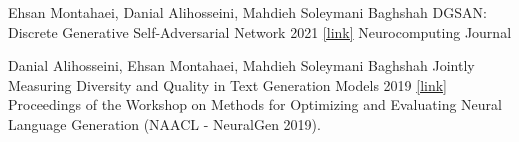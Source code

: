 
\begin{cventries}
    \cventry
    {Ehsan Montahaei, Danial Alihosseini, Mahdieh Soleymani Baghshah}
    {DGSAN: Discrete Generative Self-Adversarial Network}
    {2021}
    {\href{https://doi.org/10.1016/j.neucom.2021.03.097}{[link]}}
    {Neurocomputing Journal}

    \cventry
    {Danial Alihosseini, Ehsan Montahaei, Mahdieh Soleymani Baghshah}
    {Jointly Measuring Diversity and Quality in Text Generation Models}
    {2019}
    {\href{https://www.aclweb.org/anthology/W19-2311}{[link]}}
    {Proceedings of the Workshop on Methods for Optimizing and Evaluating Neural Language Generation (NAACL - NeuralGen 2019).}
\end{cventries}